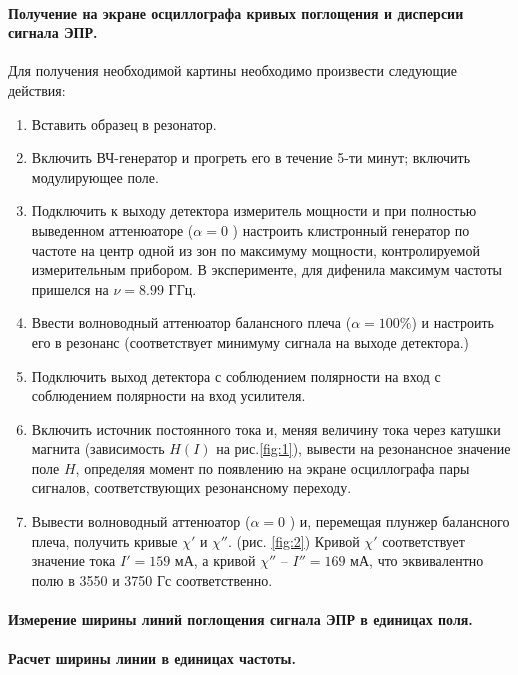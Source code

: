 \paragraph{Получение на экране осциллографа кривых поглощения и дисперсии сигнала ЭПР.}%
\label{par:1}
Для получения необходимой картины необходимо произвести следующие действия:
\begin{enumerate}
    \item Вставить образец в резонатор.
    \item Включить ВЧ-генератор и прогреть его в течение 5-ти минут; включить модулирующее поле.
    \item Подключить к выходу детектора измеритель мощности и при полностью выведенном аттенюаторе ($\alpha = 0$ ) настроить клистронный генератор по частоте
        на центр одной из зон по максимуму мощности, контролируемой измерительным прибором. В эксперименте, для дифенила максимум частоты 
        пришелся на $\nu = 8.99$ ГГц.
    \item Ввести волноводный аттенюатор балансного плеча ($\alpha = 100 \% $) и настроить его в резонанс (соответствует минимуму сигнала на выходе детектора.)
    \item Подключить выход детектора с соблюдением полярности на вход с соблюдением полярности на вход усилителя.
    \item Включить источник постоянного тока и, меняя величину тока через катушки магнита (зависимость $H(I)$ на рис.\ref{fig:1}), вывести на резонансное значение поле $H$, определяя момент по появлению на экране осциллографа 
        пары сигналов, соответствующих резонансному переходу. 

    \item Вывести волноводный аттенюатор ($ \alpha = 0$ ) и, перемещая плунжер балансного плеча, получить кривые $\chi'$ и  $\chi''$. (рис. \ref{fig:2})
     Кривой $\chi'$ соответствует значение тока $I' = 159 $ мА,  а кривой $\chi''$ -- $I'' = 169$ мА, что эквивалентно полю в 3550 и 3750 Гс соответственно.
\end{enumerate}


\paragraph{Измерение ширины линий поглощения сигнала ЭПР в единицах поля.}%


\paragraph{Расчет ширины линии в единицах частоты.}

